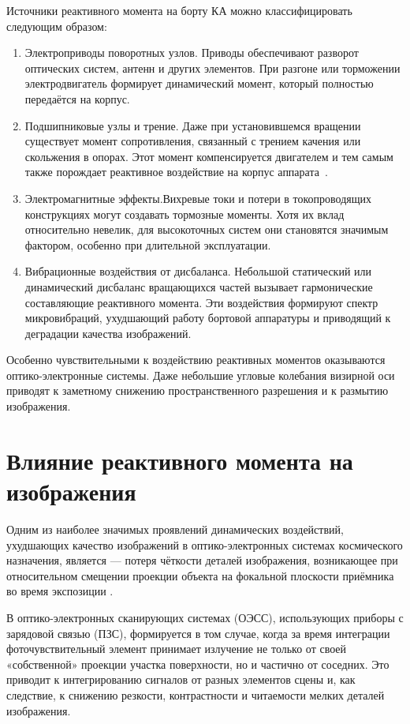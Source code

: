 Источники реактивного момента на борту КА можно классифицировать следующим образом:

\begin{enumerate}
	\item Электроприводы поворотных узлов. Приводы обеспечивают разворот оптических систем, антенн и других элементов. При разгоне или торможении электродвигатель формирует динамический момент, который полностью передаётся на корпус.
	\item Подшипниковые узлы и трение. Даже при установившемся вращении существует момент сопротивления, связанный с трением качения или скольжения в опорах. Этот момент компенсируется двигателем и тем самым также порождает реактивное воздействие на корпус аппарата~\cite{Beizelman1959, Beizelman1959}.
	\item Электромагнитные эффекты.Вихревые токи и потери в токопроводящих конструкциях могут создавать тормозные моменты. Хотя их вклад относительно невелик, для высокоточных систем они становятся значимым фактором, особенно при длительной эксплуатации.
	\item Вибрационные воздействия от дисбаланса. Небольшой статический или динамический дисбаланс вращающихся частей вызывает гармонические составляющие реактивного момента. Эти воздействия формируют спектр микровибраций, ухудшающий работу бортовой аппаратуры и приводящий к деградации качества изображений.
\end{enumerate}

Особенно чувствительными к воздействию реактивных моментов оказываются оптико-электронные системы. Даже небольшие угловые колебания визирной оси приводят к заметному снижению пространственного разрешения и к размытию изображения.


\section{Влияние реактивного момента на  изображения}

Одним из наиболее значимых проявлений динамических воздействий, ухудшающих качество изображений в оптико-электронных системах космического назначения, является  — потеря чёткости деталей изображения, возникающее при относительном смещении проекции объекта на фокальной плоскости приёмника во время экспозиции \cite{Haghshenas2015, wahballah2018smear}.

В оптико-электронных сканирующих системах (ОЭСС), использующих приборы с зарядовой связью (ПЗС),  формируется в том случае, когда за время интеграции фоточувствительный элемент принимает излучение не только от своей «собственной» проекции участка поверхности, но и частично от соседних. Это приводит к интегрированию сигналов от разных элементов сцены и, как следствие, к снижению резкости, контрастности и читаемости мелких деталей изображения.

